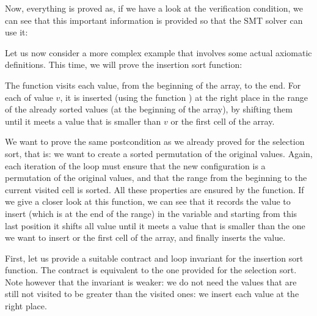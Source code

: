 


Now, everything is proved as, if we have a look at the verification condition,
we can see that this important information is provided so that the SMT solver
can use it:








Let us now consider a more complex example that involves some actual axiomatic
definitions. This time, we will prove the insertion sort function:





The  function visits each value, from the beginning
of the array, to the end. For each of value $v$, it is inserted (using the
function ) at the right place in the range of the already
sorted values (at the beginning of the array), by shifting them until it meets
a value that is smaller than $v$ or the first cell of the array.




We want to prove the same postcondition as we already proved for the selection
sort, that is: we want to create a sorted permutation of the original values.
Again, each iteration of the loop must ensure that the new configuration is a
permutation of the original values, and that the range from the beginning to
the current visited cell is sorted. All these properties are ensured by the
 function. If we give a closer look at this function, we can
see that it records the value to insert (which is at the end of the range) in
the variable  and starting from this last position it shifts
all value until it meets a value that is smaller than the one we want to insert
or the first cell of the array, and finally inserts the value.




First, let us provide a suitable contract and loop invariant for the insertion
sort function. The contract is equivalent to the one provided for the selection
sort. Note however that the invariant is weaker: we do not need the values that
are still not visited to be greater than the visited ones: we insert each value
at the right place.



